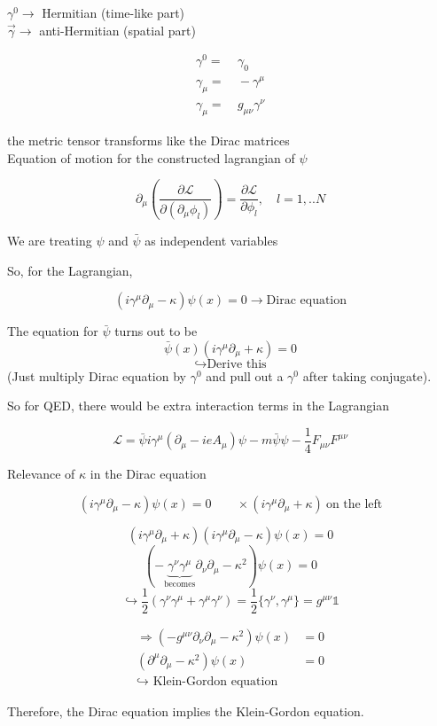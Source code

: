 \documentclass[11pt]{article}
\newcommand{\lag}{\mathcal{L}}
\begin{document}
$\gamma^0 \rightarrow$ Hermitian (time-like part)\\
$\vec{\gamma} \rightarrow$ anti-Hermitian (spatial part)


\begin{align*}
	\gamma^0 = &\ \gamma_0\\ \gamma_\mu =&\ -\gamma^\mu \\
	\gamma_\mu =&\ g_{\mu\nu} \gamma^\nu
\end{align*}

the metric tensor transforms like the Dirac matrices\\

Equation of motion for the constructed lagrangian of $\psi$

\[ \partial_\mu\left(\frac{\partial \lag}{ \partial(\partial_\mu\phi_l)}\right) = \frac{\partial\lag}{\partial \phi_l}, \quad l=1, .. N\]

We are treating $\psi$ and $\bar{\psi}$ as independent variables

So, for the Lagrangian,

\[ (i\gamma^\mu \partial_\mu - \kappa) \psi(x) = 0 \rightarrow \text{Dirac equation}\]

The equation for $\bar{\psi}$ turns out to be 
\[ \bar{\psi}(x) (i\gamma^\mu\partial_\mu + \kappa) = 0\]
$$\hookrightarrow \text{Derive this}$$
(Just multiply Dirac equation by $\gamma^0$ and pull out a $\gamma^0$ after taking conjugate).

So for QED, there would be extra interaction terms in the Lagrangian

\[ \lag = \bar{\psi} i \gamma^\mu (\partial_\mu - ieA_\mu)\psi - m\bar{\psi}\psi - \frac{1}{4}F_{\mu\nu}F^{\mu\nu}\]

Relevance of $\kappa$ in the Dirac equation

\[ (i \gamma^\mu \partial_\mu - \kappa)\psi(x) = 0 \quad \quad \times \left(i\gamma^\mu\partial_\mu + \kappa \right)\ \text{on the left}\]

\[ (i\gamma^\mu \partial_\mu + \kappa)(i\gamma^\mu \partial_\mu - \kappa) \psi(x) = 0\]
\[ (-\underbrace{\gamma^\nu\gamma^\mu}_{\text{becomes}}\partial_\nu \partial_\mu - \kappa^2)\psi(x) = 0 \]
\[ \hookrightarrow \frac{1}{2}(\gamma^\nu \gamma^\mu + \gamma^\mu\gamma^\nu) = \frac{1}{2} \{\gamma^\nu, \gamma^\mu\} = g^{\mu\nu}\mathbb{1}\]

\begin{align*}
	\Rightarrow (-g^{\mu\nu} \partial_\nu \partial_\mu - \kappa^2) \psi(x) &= 0\\
	(\partial^\mu\partial_\mu - \kappa^2)\psi(x) &= 0\\
	\hookrightarrow \text{ Klein-Gordon equation}
\end{align*}  

Therefore, the Dirac equation implies the Klein-Gordon equation.
\end{document}
